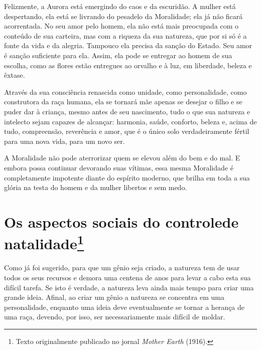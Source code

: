 Felizmente, a Aurora está emergindo do caos e da escuridão. A mulher
está despertando, ela está se livrando do pesadelo da Moralidade; ela já
não ficará acorrentada. No seu amor pelo homem, ela não está mais
preocupada com o conteúdo de sua carteira, mas com a riqueza da sua
natureza, que por si só é a fonte da vida e da alegria. Tampouco ela
precisa da sanção do Estado. Seu amor é sanção suficiente para ela.
Assim, ela pode se entregar ao homem de sua escolha, como as flores
estão entregues ao orvalho e à luz, em liberdade, beleza e êxtase.

Através da sua consciência renascida como unidade, como personalidade,
como construtora da raça humana, ela se tornará mãe apenas se desejar o
filho e se puder dar à criança, mesmo antes de seu nascimento, tudo o
que sua natureza e intelecto sejam capazes de alcançar: harmonia, saúde,
conforto, beleza e, acima de tudo, compreensão, reverência e amor, que é
o único solo verdadeiramente fértil para uma nova vida, para um novo
ser.

A Moralidade não pode aterrorizar quem se elevou além do bem e do mal. E
embora possa continuar devorando suas vítimas, essa mesma Moralidade é
completamente impotente diante do espírito moderno, que brilha em toda a
sua glória na testa do homem e da mulher libertos e sem medo.

\chapter[Os aspectos sociais do controle de natalidade]{Os aspectos sociais do controle\break de natalidade\footnote{Texto
  originalmente publicado no jornal \emph{Mother Earth} (1916).}}

Como já foi sugerido, para que um gênio seja criado, a natureza tem de
usar todos os seus recursos e demora uma centena de anos para levar a
cabo esta sua difícil tarefa. Se isto é verdade, a natureza leva ainda
mais tempo para criar uma grande ideia. Afinal, ao criar um gênio a
natureza se concentra em uma personalidade, enquanto uma ideia deve
eventualmente se tornar a herança de uma raça, devendo, por isso, ser
necessariamente mais difícil de moldar.

